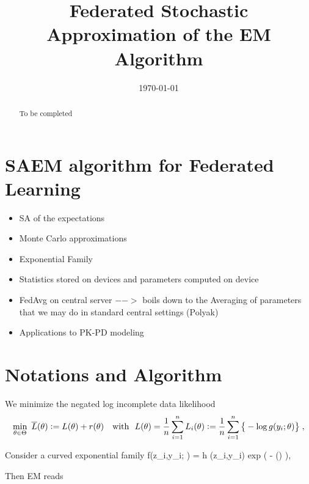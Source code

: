 \documentclass[11pt]{article}
\theoremstyle{t}
\begin{document}
\title{Federated Stochastic Approximation of the EM Algorithm}
\date{\today}

\maketitle

\begin{abstract}
To be completed
\end{abstract}


\section{SAEM algorithm for Federated Learning}
\begin{itemize}
\item SA of the expectations
\item Monte Carlo approximations
\item Exponential Family
\item Statistics stored on devices and parameters computed on device
\item FedAvg on central server $-->$ boils down to the Averaging of parameters that we may do in standard central settings (Polyak)
\item Applications to PK-PD modeling
\end{itemize}

\section{Notations and Algorithm}

We minimize the negated log incomplete data likelihood 
\begin{align} \label{eq:em_motivate}
\begin{split} 
 \min_{ \theta \in \Theta }~ \overline{L} ( \theta ) \eqdef  L ( \theta ) + r (\theta) \quad \text{with}~~L(\theta) = \frac{1}{n} \sum_{i=1}^n L_i( \theta) \eqdef  \frac{1}{n} \sum_{i=1}^n \big\{ - \log g( y_i ; \theta ) \big\}\eqs,
\end{split} 
\end{align}


Consider a curved exponential family
\beq \label{eq:exp}
f(z_i,y_i; \theta) = h  (z_i,y_i) \textrm{exp} (  - \psi(\theta) )\eqs,
\eeq

Then EM reads
\end{document}
